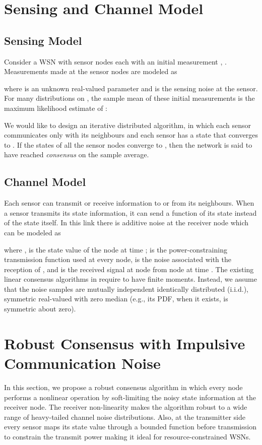 \documentclass[onecolumn, draft, 12pt]{IEEEtran}
\begin{document}
\section{Sensing and Channel Model} \label{sec:consensus_no_noise_robust}
\subsection{Sensing Model}\label{subsec:nld_sys_model_robust}
Consider a WSN with  sensor nodes each with an initial measurement , . Measurements made at the sensor nodes are modeled as

where  is an unknown real-valued parameter and  is the sensing noise at the  sensor. For many distributions on , the sample mean of these initial measurements is the maximum likelihood estimate of :

We would like to design an iterative distributed algorithm, in which each sensor communicates only with its neighbours and each sensor has a state that converges to . If the states of all the sensor nodes converge to  , then the network is said to have reached \emph{consensus} on the sample average.  

\subsection{Channel Model}\label{subsec:nld_chn_model_robust}

Each sensor can transmit or receive information to or from its neighbours. When a sensor transmits its state information, it can send a function of its state instead of the state itself. In this link there is additive noise at the receiver node which can be modeled as


where , is the state value of the  node at time ;   is the power-constraining transmission function used at every node,  is the noise associated with the reception of , and  is the received signal at node  from node  at time . The existing linear consensus algorithms in \cite{Boyd2007,Touri2009,MinyiHuang2007,Pescosolido2008,Barbarossa2008,MinyiHuang2008,AysalBarner2010,Nedic2011cvx, KarMoura2009,KarMoura2007} require  to have finite moments. Instead, we assume that the noise samples  are mutually independent identically distributed (i.i.d.), symmetric real-valued with zero median (e.g., its PDF, when it exists, is symmetric about zero).

\section{Robust Consensus with Impulsive Communication Noise} \label{sec:consensus_with_noise_robust}
In this section, we propose a robust consensus algorithm in which every node performs a nonlinear operation by soft-limiting the noisy state information at the receiver node. The receiver non-linearity makes the algorithm robust to a wide range of heavy-tailed channel noise distributions. Also, at the transmitter side every sensor maps its state value through a bounded function before transmission to constrain the transmit power making it ideal for resource-constrained WSNs. 
\end{document}
